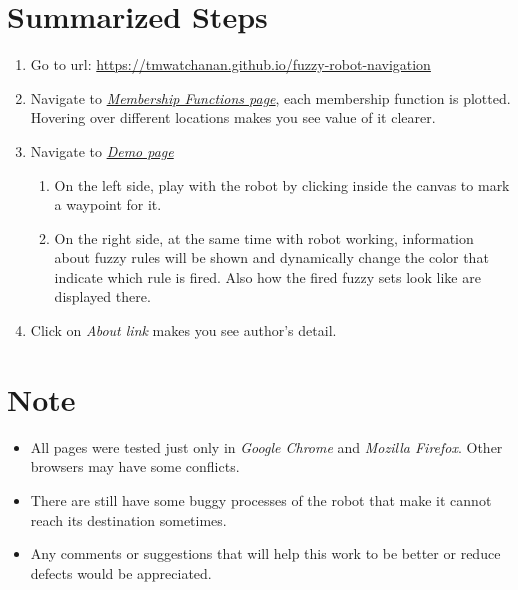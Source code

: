 \documentclass[paper=a4, fontsize=11pt]{scrartcl}
\numberwithin{equation}{section}		%
\numberwithin{figure}{section}			%
\numberwithin{table}{section}				%
\begin{document}
	\section{Summarized Steps}
	\begin{enumerate}
		\item Go to url: \url{https://tmwatchanan.github.io/fuzzy-robot-navigation}
		\item Navigate to \href{https://tmwatchanan.github.io/fuzzy-robot-navigation/membership-functions.html}{\textit{Membership Functions page}}, each membership function is plotted. Hovering over different locations makes you see value of it clearer.
		\item Navigate to \href{https://tmwatchanan.github.io/fuzzy-robot-navigation/robot_navigation.html}{\textit{Demo page}}
			\begin{enumerate}
				\item On the left side, play with the robot by clicking inside the canvas to mark a waypoint for it.
				\item On the right side, at the same time with robot working, information about fuzzy rules will be shown and dynamically change the color that indicate which rule is fired. Also how the fired fuzzy sets look like are displayed there.
			\end{enumerate}
		\item Click on \textit{About link} makes you see author's detail.
	\end{enumerate}

	\section{Note}
	\begin{itemize}
		\item All pages were tested just only in \textit{Google Chrome} and \textit{Mozilla Firefox}. Other browsers may have some conflicts.
		\item There are still have some buggy processes of the robot that make it cannot reach its destination sometimes.
		\item Any comments or suggestions that will help this work to be better or reduce defects would be appreciated.
	\end{itemize}
	
\end{document}
